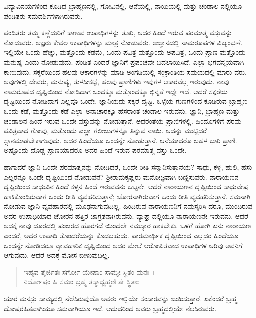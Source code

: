 {\small ವಿದ್ಯಾವಿನಯಗಳಿಂದ ಕೂಡಿದ ಬ್ರಾಹ್ಮಣನಲ್ಲಿ, ಗೋವಿನಲ್ಲಿ, ಆನೆಯಲ್ಲಿ, ನಾಯಿಯಲ್ಲಿ ಮತ್ತು ಚಂಡಾಲ ನಲ್ಲಿಯೂ ಪಂಡಿತರು ಸಮದರ್ಶಿಗಳಾಗಿರುವರು.}

ಪಂಡಿತರು ತಮ್ಮ ಕಣ್ಣೆದುರಿಗೆ ಕಾಣುವ ಉಪಾಧಿಗಳನ್ನು ತೂರಿ, ಅದರ ಹಿಂದೆ ಇರುವ ಪರಮಾತ್ಮ ವಸ್ತುವನ್ನು ನೋಡುವರು. ಅಜ್ಞರು ಕೇವಲ ಉಪಾಧಿಗಳನ್ನು ಮಾತ್ರ ನೋಡುವರು. ಅಜ್ಞಾನದಲ್ಲಿ ನಾಮರೂಪಗಳ ವಿಜೃಂಭಣೆ. ಇಲ್ಲಿಯೇ ಒಂದು ಹೆಚ್ಚು, ಮತ್ತೊಂದು ಕಡಮೆ, ಒಂದು ಪವಿತ್ರ ಮತ್ತೊಂದು ಅಪವಿತ್ರ, ಒಂದು ಪ್ರಾಣಿ ಮತ್ತೊಂದು ಮನುಷ್ಯ ಎಂದು ನೋಡುವುದು. ಪಂಡಿತ ಎಂದರೆ ಜ್ಞಾನಿಗೆ ಪ್ರಪಂಚವೇ ಬದಲಾಯಿಸಿದೆ. ಎಲ್ಲಾ ಭಗವನ್ಮಯವಾಗಿ ಕಾಣುವುದು. ಸಕ್ಕರೆಯಿಂದ ಹಲವು ಆಕಾರಗಳನ್ನು ಮಾಡಿ ಅಂಗಡಿಯಲ್ಲಿ ಸಂಕ್ರಾಂತಿಯ ಸಮಯದಲ್ಲಿ ಮಾರು ವರು. ಅವುಗಳಲ್ಲಿ ದೇವರು, ಮನುಷ್ಯ, ತುಳಸೀಕಟ್ಟೆ, ಹಲವು ಪ್ರಾಣಿಗಳು ಇವುಗಳ ಆಕಾರವೆಲ್ಲ ಇರುವುದು. ನಾವು ನಾಮರೂಪದ ದೃಷ್ಟಿಯಿಂದ ನೋಡಿದಾಗ ಒಂದಕ್ಕೂ ಮತ್ತೊಂದಕ್ಕೂ ಭಿನ್ನತೆ ಇದ್ದೇ ಇದೆ. ಆದರೆ ಸಕ್ಕರೆಯ ದೃಷ್ಟಿಯಿಂದ ನೋಡಿದಾಗ ಎಲ್ಲವೂ ಒಂದೇ. ಜ್ಞಾನಿಯದು ಸಕ್ಕರೆ ದೃಷ್ಟಿ. ಒಳ್ಳೆಯ ಗುಣಗಳಿಂದ ಕೂಡಿರುವ ಬ್ರಾಹ್ಮಣ ಒಂದು ಕಡೆ, ಮತ್ತೊಂದು ಕಡೆ ಎಲ್ಲಾ ಅನಾಚಾರಕ್ಕೂ ಹೆಸರಾಂತ ಚಂಡಾಲ ಇರುವನು. ಜ್ಞಾನಿ, ಬ್ರಾಹ್ಮಣ ಮತ್ತು ಚಂಡಾಲನ ಹಿಂದೆ ಇರುವ ಒಂದೇ ವಸ್ತುವನ್ನು ನೋಡುತ್ತಾನೆ. ಅದರಂತೆಯೆ ಪ್ರಾಣಿಗಳಲ್ಲಿ. ಹಿಂದೂಗಳಿಗೆ ಪರಮ ಪವಿತ್ರವಾದ ಗೋವು, ಮತ್ತೊಂದು ಎಲ್ಲಾ ಗಲೀಜುಗಳನ್ನೂ ತಿನ್ನುವ ನಾಯಿ. ಅದನ್ನು ಮುಟ್ಟಿದರೆ ಸ್ನಾನಮಾಡಬೇಕಾಗುವುದು. ಅದರ ಹಿಂದೆಯೂ ಒಂದನ್ನೇ ನೋಡುತ್ತಾನೆ. ಆನೆಯಾದರೊ ಬಹಳ ಭಾರಿ ಪ್ರಾಣಿ. ಅಷ್ಟೊಂದು ದೊಡ್ಡ ಪ್ರಾಣಿಯಾದರೂ ಅದರ ಹಿಂದೆ ಇರುವ ಪರಮಾತ್ಮ ವಸ್ತು ಒಂದೇ.

ಹಾಗಾದರೆ ಜ್ಞಾನಿ ಒಂದೇ ಪರಮಾತ್ಮನನ್ನು ನೋಡಿದರೆ, ಒಂದೇ ರೀತಿ ಸನ್ಮಾನಿಸುತ್ತಾನೆಯೆ? ಸಾಧು, ಕಳ್ಳ, ಹುಲಿ, ಹಸು ಎಲ್ಲರನ್ನೂ ಒಂದೇ ದೃಷ್ಟಿಯಿಂದ ನೋಡುವನೆ? ಶ‍್ರೀರಾಮಕೃಷ್ಣರು ಮನೋಜ್ಞವಾಗಿ ಬಣ್ಣಿಸುವರು. ನಾರಾಯಣನ ದೃಷ್ಟಿಯಿಂದ ಸಾಧುವಿನ ಹಿಂದೆ ಕಳ್ಳನ ಹಿಂದೆ ಇರುವವನು ಒಬ್ಬನೇ. ಆದರೆ ನಾರಾಯಣನ ದೃಷ್ಟಿಯಿಂದ ಸಾಧುವೇಷ ಹಾಕಿಕೊಂಡಿರುವಾಗ ಒಂದು ರೀತಿ ವ್ಯವಹರಿಸುತ್ತಾನೆ; ಚೋರನಾಗಿರುವಾಗ ಒಂದು ರೀತಿ ವ್ಯವಹರಿಸುತ್ತಾನೆ. ಸಮನಾಗಿ ನೋಡುವ ಜ್ಞಾನಿ ವ್ಯವಹಾರದಲ್ಲಿ ಮೂಢನಾಗುವುದಿಲ್ಲ. ಹಿಂದಿರುವ ನಾರಾಯಣನಿಗೆ ನಮಸ್ಕರಿಸಿ ದರೂ, ಮುಂದಿರುವ ಅದರ ಉಪಾಧಿಯಾದ ಚೋರನ ಹತ್ತಿರ ಜಾಗ್ರತನಾಗಿರುವನು. ವ್ಯಾಘ್ರ ದಲ್ಲಿಯೂ ನಾರಾಯಣನೇ ಇರುವನು. ಆದರೆ ಅದಕ್ಕೆ ನಾವು ದೂರದಲ್ಲಿ ಪಂಜರದ ಹೊರಗಡೆ ಯಿಂದಲೇ ನಮಸ್ಕಾರ ಹಾಕಬೇಕು. ಒಳಗೆ ಹೋಗಿ ಏನು ನಾರಾಯಣ ಎಂದರೆ, ಅದರ ಉಪಾಧಿ ತೊಂದರೆಯನ್ನು ಕೊಡಬಹುದು. ಪಾರಮಾರ್ಥಿಕ ದೃಷ್ಟಿಯಿಂದ ಎಲ್ಲದರ ಹಿಂದೆಯೂ ಒಂದನ್ನೇ ನೋಡಿದರೂ ವ್ಯಾವಹಾರಿಕ ದೃಷ್ಟಿಯಿಂದ ಅದರ ಮೇಲೆ ಆರೋಪಿತವಾದ ಉಪಾಧಿಗಳ ಅರಿವು ಅವನಿಗೆ ಆಗುವುದು. ಆದರೆ ಅದಕ್ಕೆ ಮೋಸ ಬೀಳುವುದಿಲ್ಲ.

\begin{verse}
ಇಹೈವ ತೈರ್ಜಿತಃ ಸರ್ಗೋ ಯೇಷಾಂ ಸಾಮ್ಯೇ ಸ್ಥಿತಂ ಮನಃ~।\\ನಿರ್ದೋಷಂ ಹಿ ಸಮಂ ಬ್ರಹ್ಮ ತಸ್ಮಾದ್ಬ್ರಹ್ಮಣಿ ತೇ ಸ್ಥಿತಾಃ 
\end{verse}

{\small ಯಾರ ಮನಸ್ಸು ಸಾಮ್ಯದಲ್ಲಿ ನೆಲೆಸಿರುವುದೊ ಅವರು ಇಲ್ಲಿಯೇ ಸಂಸಾರವನ್ನು ಜಯಿಸುತ್ತಾರೆ. ಏಕೆಂದರೆ ಬ್ರಹ್ಮ ದೋಷರಹಿತವಾಗಿಯೂ ಸಮವಾಗಿಯೂ ಇದೆ. ಆದುದರಿಂದ ಅವರು ಬ್ರಹ್ಮದಲ್ಲಿಯೇ ನೆಲಸಿರುವರು.}

